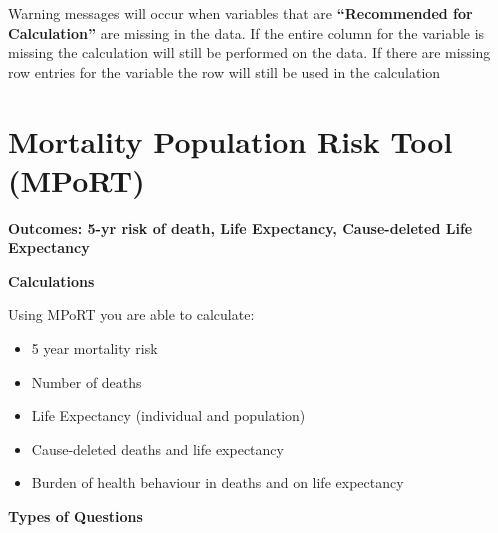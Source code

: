 \documentclass[]{book}
\begin{document}
Warning messages will occur when variables that are
\textbf{``Recommended for Calculation''} are missing in the data. If the
entire column for the variable is missing the calculation will still be
performed on the data. If there are missing row entries for the variable
the row will still be used in the calculation


















































\appendix


\chapter{Mortality Population Risk Tool
(MPoRT)}\label{mortality-population-risk-tool-mport}

\textbf{Outcomes: 5-yr risk of death, Life Expectancy, Cause-deleted
Life Expectancy}

\textbf{Calculations}

Using MPoRT you are able to calculate:

\begin{itemize}
\item
  5 year mortality risk
\item
  Number of deaths
\item
  Life Expectancy (individual and population)
\item
  Cause-deleted deaths and life expectancy
\item
  Burden of health behaviour in deaths and on life expectancy
\end{itemize}

\textbf{Types of Questions}
\end{document}
